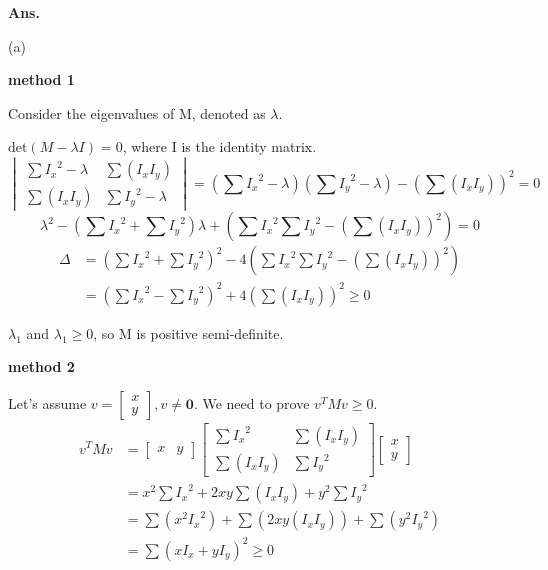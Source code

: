 \documentclass[12pt, a4paper, UTF8, fontset=windows]{ctexbook}
\newenvironment{solution}{\par\noindent\textbf{Ans.}}{\par}
\begin{document}
\begin{solution}
    
    (a) 
    
    \textbf{method 1}    

    Consider the eigenvalues of M, denoted as $\lambda$.
    
    $\text{det}(M - \lambda I) = 0$, where I is the identity matrix.
    $$
    \begin{vmatrix}
    \sum {I_x}^2 - \lambda & \sum (I_x I_y) \\
    \sum (I_x I_y) & \sum {I_y}^2 - \lambda
    \end{vmatrix}
    = (\sum {I_x}^2 - \lambda)(\sum {I_y}^2 - \lambda) - (\sum (I_x I_y))^2 = 0
    $$
    $$
    \lambda^2 - (\sum {I_x}^2 + \sum {I_y}^2)\lambda + (\sum {I_x}^2 \sum {I_y}^2 - (\sum (I_x I_y))^2) = 0
    $$
    $$
    \begin{aligned}
    \Delta 
    &= (\sum {I_x}^2 + \sum {I_y}^2)^2 - 4(\sum {I_x}^2 \sum {I_y}^2 - (\sum (I_x I_y))^2) \\ 
    &= (\sum {I_x}^2 - \sum {I_y}^2)^2 + 4(\sum (I_x I_y))^2 \geq 0
    \end{aligned}
    $$
    
    $\lambda_1$ and $\lambda_1 \geq 0$, so M is positive semi-definite.

    \textbf{method 2}

    Let's assume $v = \begin{bmatrix} x \\ y \end{bmatrix}, v \neq \mathbf{0}$.
    We need to prove $v^T M v \geq 0$.
    $$
    \begin{aligned}
    v^T M v 
    &= \begin{bmatrix} x & y \end{bmatrix} \begin{bmatrix} \sum {I_x}^2 & \sum (I_x I_y) \\ \sum (I_x I_y) & \sum {I_y}^2 \end{bmatrix} \begin{bmatrix} x \\ y \end{bmatrix} \\
    &= x^2\sum {I_x}^2 + 2xy\sum (I_x I_y) + y^2\sum {I_y}^2 \\
    &= \sum(x^2 {I_x}^2) + \sum(2xy (I_x I_y)) + \sum(y^2 {I_y}^2) \\
    &= \sum(x I_x + y I_y)^2
    \geq 0
    \end{aligned}
    $$


\end{solution}
\end{document}
